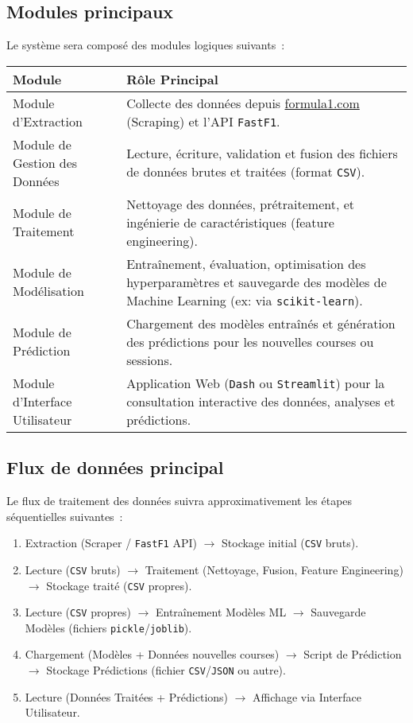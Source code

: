 \documentclass[11pt, a4paper]{article}
\newcommand{\lib}[1]{\texttt{#1}}
\begin{document}
\subsection{Modules principaux}
Le système sera composé des modules logiques suivants~:

\medskip
\noindent
\begin{tabularx}{\textwidth}{@{} >{\RaggedRight}p{} X @{}}
\toprule
\textbf{Module} & \textbf{Rôle Principal} \\
\midrule
Module d'Extraction & Collecte des données depuis \url{formula1.com} (Scraping) et l'API \lib{FastF1}. \\
\addlinespace
Module de Gestion des Données & Lecture, écriture, validation et fusion des fichiers de données brutes et traitées (format \lib{CSV}). \\
\addlinespace
Module de Traitement & Nettoyage des données, prétraitement, et ingénierie de caractéristiques (feature engineering). \\
\addlinespace
Module de Modélisation & Entraînement, évaluation, optimisation des hyperparamètres et sauvegarde des modèles de Machine Learning (ex: via \lib{scikit-learn}). \\
\addlinespace
Module de Prédiction & Chargement des modèles entraînés et génération des prédictions pour les nouvelles courses ou sessions. \\
\addlinespace
Module d'Interface Utilisateur & Application Web (\lib{Dash} ou \lib{Streamlit}) pour la consultation interactive des données, analyses et prédictions. \\
\bottomrule
\end{tabularx}
\medskip

\subsection{Flux de données principal}
Le flux de traitement des données suivra approximativement les étapes séquentielles suivantes~:
\begin{enumerate}[label=(\alph*), itemsep=0.2em, leftmargin=*]
    \item Extraction (Scraper / \lib{FastF1} API) $\rightarrow$ Stockage initial (\lib{CSV} bruts).
    \item Lecture (\lib{CSV} bruts) $\rightarrow$ Traitement (Nettoyage, Fusion, Feature Engineering) $\rightarrow$ Stockage traité (\lib{CSV} propres).
    \item Lecture (\lib{CSV} propres) $\rightarrow$ Entraînement Modèles ML $\rightarrow$ Sauvegarde Modèles (fichiers \lib{pickle}/\lib{joblib}).
    \item Chargement (Modèles + Données nouvelles courses) $\rightarrow$ Script de Prédiction $\rightarrow$ Stockage Prédictions (fichier \lib{CSV}/\lib{JSON} ou autre).
    \item Lecture (Données Traitées + Prédictions) $\rightarrow$ Affichage via Interface Utilisateur.
\end{enumerate}
\end{document}
